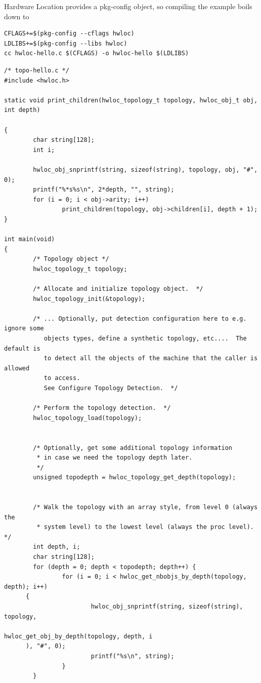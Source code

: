 Hardware Location provides a pkg-config object, so compiling the example boils down to



\begin{footnotesize}\begin{verbatim}
CFLAGS+=$(pkg-config --cflags hwloc)
LDLIBS+=$(pkg-config --libs hwloc)
cc hwloc-hello.c $(CFLAGS) -o hwloc-hello $(LDLIBS)
\end{verbatim}
\end{footnotesize}




\begin{DocInclude}\begin{verbatim}/* topo-hello.c */
#include <hwloc.h>

static void print_children(hwloc_topology_t topology, hwloc_obj_t obj, int depth)
      
{
        char string[128];
        int i;

        hwloc_obj_snprintf(string, sizeof(string), topology, obj, "#", 0);
        printf("%*s%s\n", 2*depth, "", string);
        for (i = 0; i < obj->arity; i++)
                print_children(topology, obj->children[i], depth + 1);
}

int main(void)
{
        /* Topology object */
        hwloc_topology_t topology;

        /* Allocate and initialize topology object.  */
        hwloc_topology_init(&topology);

        /* ... Optionally, put detection configuration here to e.g. ignore some
           objects types, define a synthetic topology, etc....  The default is
           to detect all the objects of the machine that the caller is allowed
           to access.
           See Configure Topology Detection.  */

        /* Perform the topology detection.  */
        hwloc_topology_load(topology);


        /* Optionally, get some additional topology information
         * in case we need the topology depth later.
         */
        unsigned topodepth = hwloc_topology_get_depth(topology);


        /* Walk the topology with an array style, from level 0 (always the
         * system level) to the lowest level (always the proc level). */
        int depth, i;
        char string[128];
        for (depth = 0; depth < topodepth; depth++) {
                for (i = 0; i < hwloc_get_nbobjs_by_depth(topology, depth); i++) 
      {
                        hwloc_obj_snprintf(string, sizeof(string), topology,
                                        hwloc_get_obj_by_depth(topology, depth, i
      ), "#", 0);
                        printf("%s\n", string);
                }
        }


\end{verbatim}
\end{DocInclude}
